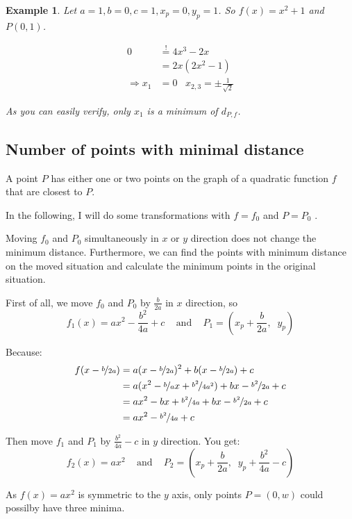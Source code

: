 \documentclass[a4paper]{scrartcl}
\theoremstyle{break}
\newtheorem{example}{Example}
\theoremstyle{nonumberplain}
\begin{document}
\begin{example}
    Let $a = 1,  b = 0,  c= 1, x_p= 0, y_p = 1$.
    So $f(x) = x^2 + 1$ and $P(0, 1)$.

\begin{align}
    0 &\stackrel{!}{=} 4 x^3 - 2x\\
      &=2x(2x^2 - 1)\\
    \Rightarrow x_1 &= 0 \;\;\; x_{2,3} = \pm \frac{1}{\sqrt{2}}
\end{align}

As you can easily verify, only $x_1$ is a minimum of $d_{P,f}$.
\end{example}


\subsection{Number of points with minimal distance}
\begin{theorem}
    A point $P$ has either one or two points on the graph of a 
    quadratic function $f$ that are closest to $P$.
\end{theorem}

In the following, I will do some transformations with $f = f_0$ and
$P = P_0$ .

Moving $f_0$ and $P_0$ simultaneously in $x$ or $y$ direction does 
not change the minimum distance. Furthermore, we can find the 
points with minimum distance on the moved situation and calculate
the minimum points in the original situation.

First of all, we move $f_0$ and $P_0$ by $\frac{b}{2a}$ in $x$ direction, so
\[f_1(x) = ax^2 - \frac{b^2}{4a} + c \;\;\;\text{ and }\;\;\; P_1 = \left (x_p+\frac{b}{2a},\;\; y_p \right )\]

Because:
\begin{align}
    f(x-\nicefrac{b}{2a}) &= a (x-\nicefrac{b}{2a})^2 + b (x-\nicefrac{b}{2a}) + c\\
    &= a (x^2 - \nicefrac{b}{a} x + \nicefrac{b^2}{4a^2}) + bx - \nicefrac{b^2}{2a} + c\\
    &= ax^2 - bx + \nicefrac{b^2}{4a} + bx - \nicefrac{b^2}{2a} + c\\
    &= ax^2 -\nicefrac{b^2}{4a} + c
\end{align}


Then move $f_1$ and $P_1$ by $\frac{b^2}{4a}-c$ in $y$ direction. You get:
\[f_2(x) = ax^2\;\;\;\text{ and }\;\;\; P_2 = \left (x_p+\frac{b}{2a},\;\; y_p+\frac{b^2}{4a}-c \right )\]

As $f(x) = ax^2$ is symmetric to the $y$ axis, only points 
$P = (0, w)$ could possilby have three minima.
\end{document}
